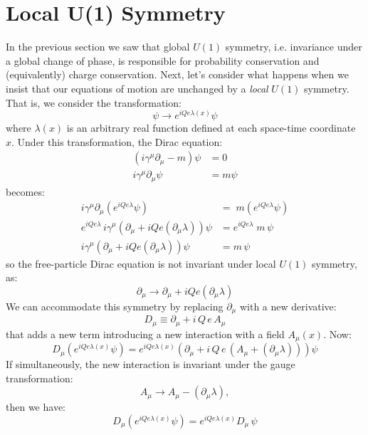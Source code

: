 \documentclass[12pt]{article}
\begin{document}
\section{Local U(1) Symmetry}

In the previous section we saw that global $U(1)$ symmetry,
i.e. invariance under a global change of phase, is responsible for
probability conservation and (equivalently) charge conservation.
Next, let's consider what happens when we insist that our equations of
motion are unchanged by a {\it local} $U(1)$ symmetry.  That is, we
consider the transformation:
$$\psi \to e^{i Qe \lambda(x)} \psi$$
where $\lambda(x)$ is an arbitrary real function defined at each
space-time coordinate $x$.  Under this transformation, the Dirac equation:
\begin{align*}
  (i \gamma^\mu \partial_\mu - m ) \psi &= 0\\
  i \gamma^\mu \partial_\mu \psi &= m \psi 
\end{align*}
becomes:
\begin{align*}
  i \gamma^\mu \partial_\mu \left( e^{iQe\lambda} \psi \right) \; &= \; m \left( e^{iQe\lambda} \psi \right) \\[5pt]
  e^{iQe\lambda} \, i \gamma^\mu \left( \partial_\mu  + i Qe (\partial_\mu \lambda) \right)  \psi
  &= e^{iQe\lambda} \; m  \, \psi \\[5pt]
  i \gamma^\mu \left( \partial_\mu  + i Qe (\partial_\mu \lambda) \right)  \psi
  &= m  \, \psi 
\end{align*}
so the free-particle Dirac equation is not invariant under local $U(1)$ symmetry, as:
$$\partial_\mu \to \partial_\mu + i Q e (\partial_\mu \lambda)$$
We can accommodate this symmetry by replacing $\partial_\mu$ with a new derivative:
$$D_\mu \equiv \partial_\mu + i \, Q \, e \, A_\mu$$
that adds a new term introducing a new interaction with a field $A_\mu(x)$. Now:
\begin{equation*}
D_\mu \left( e^{iQe\lambda(x)} \psi\right ) = e^{iQe\lambda(x)}
\left(\partial_\mu + i \, Q \, e \, (A_\mu + (\partial_\mu \lambda)) \right) \psi
\end{equation*}
If simultaneously, the new interaction is invariant under the gauge transformation:
$$A_\mu \to A_\mu - (\partial_\mu \lambda),$$
then we have:
\begin{equation*}
D_\mu \left( e^{iQe\lambda(x)} \psi \right) = e^{iQe\lambda(x)} D_\mu \, \psi
\end{equation*}
\end{document}
